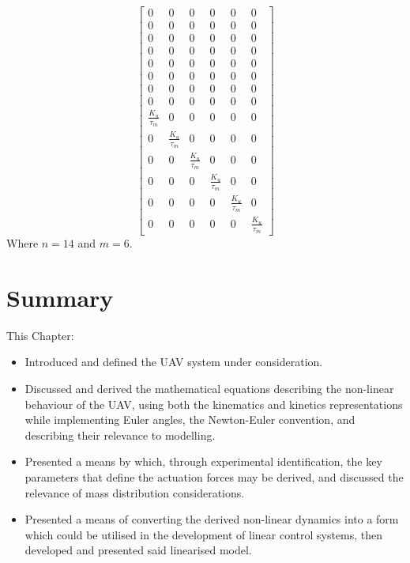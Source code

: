 \documentclass[12pt,a4paper,twoside]{report}
\begin{document}
				\begin{equation}
					\begin{bmatrix}
					0&0&0&0&0&0\\
					0&0&0&0&0&0\\
					0&0&0&0&0&0\\
					0&0&0&0&0&0\\
					0&0&0&0&0&0\\
					0&0&0&0&0&0\\
					0&0&0&0&0&0\\
					0&0&0&0&0&0\\
					\frac{K_u}{\tau_m}&0&0&0&0&0\\
					0&\frac{K_u}{\tau_m}&0&0&0&0\\
					0&0&\frac{K_u}{\tau_m}&0&0&0\\
					0&0&0&\frac{K_u}{\tau_m}&0&0\\
					0&0&0&0&\frac{K_u}{\tau_m}&0\\
					0&0&0&0&0&\frac{K_u}{\tau_m}
					\end{bmatrix}
				\end{equation}
				Where $n = 14$ and $m = 6$.
			
			\section{Summary}
				
				This Chapter:
				\begin{itemize}
					\item 
				 		Introduced and defined the UAV system under consideration.
				 	\item 
				 		Discussed and derived the mathematical equations describing the non-linear behaviour of the UAV, using both the kinematics and kinetics representations while implementing Euler angles, the Newton-Euler convention, and describing their relevance to modelling. 
				 	\item
				 		Presented a means by which, through experimental identification, the key parameters that define the actuation forces may be derived, and discussed the relevance of mass distribution considerations.
				 	\item
				 		Presented a means of converting the derived non-linear dynamics into a form which could be utilised in the development of linear control systems, then developed and presented said linearised model.
				\end{itemize}
			 
			\newpage
			
\end{document}
